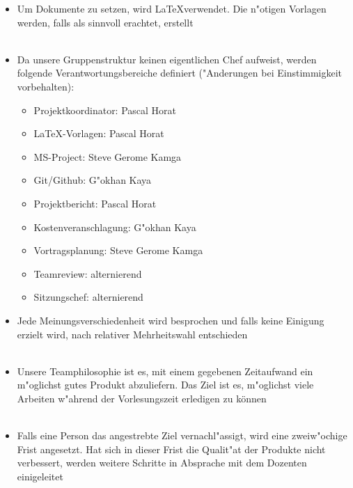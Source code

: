 \documentclass[11pt]{article}
\begin{document}
\begin{itemize}
\item Um Dokumente zu setzen, wird \LaTeX verwendet. Die n"otigen Vorlagen werden, falls als sinnvoll erachtet, erstellt\\\\
\end{itemize}

\begin{itemize}
\item Da unsere Gruppenstruktur keinen eigentlichen Chef aufweist, werden folgende Verantwortungsbereiche definiert ("Anderungen bei Einstimmigkeit vorbehalten):\\


\begin{itemize}
\item Projektkoordinator: Pascal Horat
\item LaTeX-Vorlagen: Pascal Horat
\item MS-Project: Steve Gerome Kamga
\item Git/Github: G"okhan Kaya  
\item Projektbericht: Pascal Horat
\item Kostenveranschlagung: G"okhan Kaya
\item Vortragsplanung: Steve Gerome Kamga
\item Teamreview: alternierend
\item Sitzungschef: alternierend
\end{itemize}
\end{itemize}

\begin{itemize}
\item Jede Meinungsverschiedenheit wird besprochen und falls keine Einigung erzielt wird, nach relativer Mehrheitswahl entschieden\\\\
\end{itemize}

\begin{itemize}
\item Unsere Teamphilosophie ist es, mit einem gegebenen Zeitaufwand ein m"oglichst gutes Produkt abzuliefern. Das Ziel ist es, m"oglichst viele Arbeiten w"ahrend der Vorlesungszeit erledigen zu können\\\\
\end{itemize}

\begin{itemize}
\item Falls eine Person das angestrebte Ziel vernachl"assigt, wird eine zweiw"ochige Frist angesetzt. Hat sich in dieser Frist die Qualit"at der Produkte nicht verbessert, werden weitere Schritte in Absprache mit dem Dozenten einigeleitet\\\\
\end{itemize}
 
\end{document}
